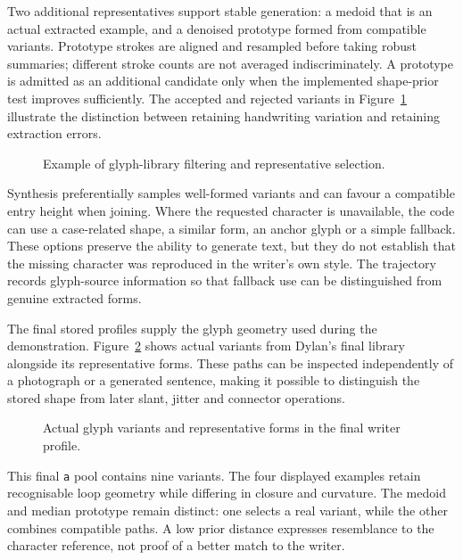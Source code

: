 Two additional representatives support stable generation: a medoid that is an actual extracted example, and a denoised prototype formed from compatible variants. Prototype strokes are aligned and resampled before taking robust summaries; different stroke counts are not averaged indiscriminately. A prototype is admitted as an additional candidate only when the implemented shape-prior test improves sufficiently. The accepted and rejected variants in Figure~\ref{fig:des-glyphquality} illustrate the distinction between retaining handwriting variation and retaining extraction errors.
\begin{figure}[!htbp]\centering
{}
\caption{Example of glyph-library filtering and representative selection.}
\label{fig:des-glyphquality}
\end{figure}

Synthesis preferentially samples well-formed variants and can favour a compatible entry height when joining. Where the requested character is unavailable, the code can use a case-related shape, a similar form, an anchor glyph or a simple fallback. These options preserve the ability to generate text, but they do not establish that the missing character was reproduced in the writer's own style. The trajectory records glyph-source information so that fallback use can be distinguished from genuine extracted forms.

The final stored profiles supply the glyph geometry used during the demonstration. Figure~\ref{fig:des-profile-example} shows actual variants from Dylan's final library alongside its representative forms. These paths can be inspected independently of a photograph or a generated sentence, making it possible to distinguish the stored shape from later slant, jitter and connector operations.
\begin{figure}[!htbp]\centering
{}
\caption{Actual glyph variants and representative forms in the final writer profile.}
\label{fig:des-profile-example}
\end{figure}
This final \texttt{a} pool contains nine variants. The four displayed examples retain recognisable loop geometry while differing in closure and curvature. The medoid and median prototype remain distinct: one selects a real variant, while the other combines compatible paths. A low prior distance expresses resemblance to the character reference, not proof of a better match to the writer.

